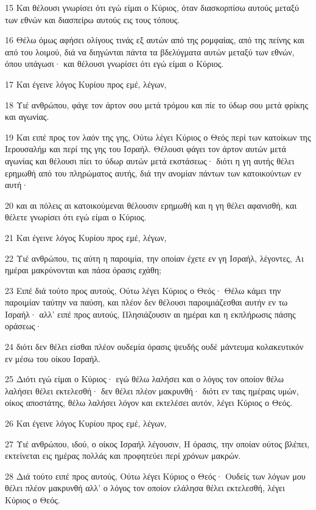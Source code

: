 \par 15 Και θέλουσι γνωρίσει ότι εγώ είμαι ο Κύριος, όταν διασκορπίσω αυτούς μεταξύ των εθνών και διασπείρω αυτούς εις τους τόπους.
\par 16 Θέλω όμως αφήσει ολίγους τινάς εξ αυτών από της ρομφαίας, από της πείνης και από του λοιμού, διά να διηγώνται πάντα τα βδελύγματα αυτών μεταξύ των εθνών, όπου υπάγωσι· και θέλουσι γνωρίσει ότι εγώ είμαι ο Κύριος.
\par 17 Και έγεινε λόγος Κυρίου προς εμέ, λέγων,
\par 18 Υιέ ανθρώπου, φάγε τον άρτον σου μετά τρόμου και πίε το ύδωρ σου μετά φρίκης και αγωνίας.
\par 19 Και ειπέ προς τον λαόν της γης, Ούτω λέγει Κύριος ο Θεός περί των κατοίκων της Ιερουσαλήμ και περί της γης του Ισραήλ. Θέλουσι φάγει τον άρτον αυτών μετά αγωνίας και θέλουσι πίει το ύδωρ αυτών μετά εκστάσεως· διότι η γη αυτής θέλει ερημωθή από του πληρώματος αυτής, διά την ανομίαν πάντων των κατοικούντων εν αυτή·
\par 20 και αι πόλεις αι κατοικούμεναι θέλουσιν ερημωθή και η γη θέλει αφανισθή, και θέλετε γνωρίσει ότι εγώ είμαι ο Κύριος.
\par 21 Και έγεινε λόγος Κυρίου προς εμέ, λέγων,
\par 22 Υιέ ανθρώπου, τις αύτη η παροιμία, την οποίαν έχετε εν γη Ισραήλ, λέγοντες, Αι ημέραι μακρύνονται και πάσα όρασις εχάθη;
\par 23 Ειπέ διά τούτο προς αυτούς, Ούτω λέγει Κύριος ο Θεός· Θέλω κάμει την παροιμίαν ταύτην να παύση, και πλέον δεν θέλουσι παροιμιάζεσθαι αυτήν εν τω Ισραήλ· αλλ' ειπέ προς αυτούς, Πλησιάζουσιν αι ημέραι και η εκπλήρωσις πάσης οράσεως·
\par 24 διότι δεν θέλει είσθαι πλέον ουδεμία όρασις ψευδής ουδέ μάντευμα κολακευτικόν εν μέσω του οίκου Ισραήλ.
\par 25 Διότι εγώ είμαι ο Κύριος· εγώ θέλω λαλήσει και ο λόγος τον οποίον θέλω λαλήσει θέλει εκτελεσθή· δεν θέλει πλέον μακρυνθή· διότι εν ταις ημέραις υμών, οίκος αποστάτης, θέλω λαλήσει λόγον και εκτελέσει αυτόν, λέγει Κύριος ο Θεός.
\par 26 Και έγεινε λόγος Κυρίου προς εμέ, λέγων,
\par 27 Υιέ ανθρώπου, ιδού, ο οίκος Ισραήλ λέγουσιν, Η όρασις, την οποίαν ούτος βλέπει, εκτείνεται εις ημέρας πολλάς και προφητεύει περί χρόνων μακρών.
\par 28 Διά τούτο ειπέ προς αυτούς, Ούτω λέγει Κύριος ο Θεός· Ουδείς των λόγων μου θέλει πλέον μακρυνθή αλλ' ο λόγος τον οποίον ελάλησα θέλει εκτελεσθή, λέγει Κύριος ο Θεός.

